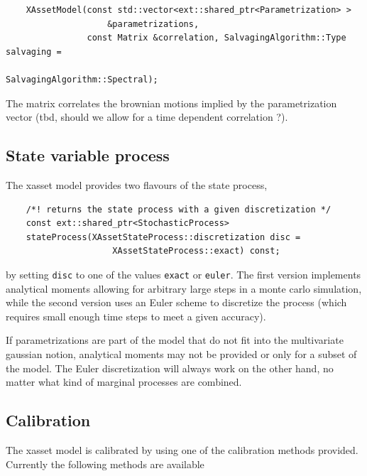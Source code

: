 \documentclass[12pt, a4paper]{article}
\begin{document}
\medskip
\scriptsize
\begin{verbatim}
    XAssetModel(const std::vector<ext::shared_ptr<Parametrization> >
                    &parametrizations,
                const Matrix &correlation, SalvagingAlgorithm::Type salvaging =
                                               SalvagingAlgorithm::Spectral);
\end{verbatim}
\normalsize
\medskip

The matrix correlates the brownian motions implied by the parametrization vector (tbd, should we allow for a time dependent correlation ?).

\subsection{State variable process}

The xasset model provides two flavours of the state process,

\medskip
\scriptsize
\begin{verbatim}
    /*! returns the state process with a given discretization */
    const ext::shared_ptr<StochasticProcess>
    stateProcess(XAssetStateProcess::discretization disc =
                     XAssetStateProcess::exact) const;
\end{verbatim}
\normalsize
\medskip

by setting \verb+disc+ to one of the values \verb+exact+ or \verb+euler+. The first version implements analytical moments allowing for arbitrary large steps in a monte carlo simulation, while the second version uses an Euler scheme to discretize the process (which requires small enough time steps to meet a given accuracy).

If parametrizations are part of the model that do not fit into the multivariate gaussian notion, analytical moments may not be provided or only for a subset of the model. The Euler discretization will always work on the other hand, no matter what kind of marginal processes are combined.

\subsection{Calibration}

The xasset model is calibrated by using one of the calibration methods provided. Currently the following methods are available
\end{document}
